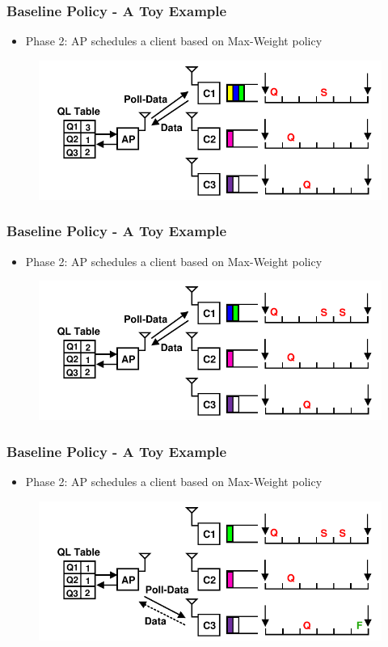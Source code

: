 \documentclass{beamer}
\begin{document}
\begin{frame}
\frametitle{Baseline Policy - A Toy Example}
\begin{itemize}
\item Phase 2: AP schedules a client based on Max-Weight policy
\end{itemize}
\begin{figure}
\centering
\includegraphics[scale=0.85]{animation_04.pdf}
\end{figure}
\end{frame}

\begin{frame}
\frametitle{Baseline Policy - A Toy Example}
\begin{itemize}
\item Phase 2: AP schedules a client based on Max-Weight policy
\end{itemize}
\begin{figure}
\centering
\includegraphics[scale=0.85]{animation_05.pdf}
\end{figure}
\end{frame}

\begin{frame}
\frametitle{Baseline Policy - A Toy Example}
\begin{itemize}
\item Phase 2: AP schedules a client based on Max-Weight policy
\end{itemize}
\begin{figure}
\centering
\includegraphics[scale=0.85]{animation_06.pdf}
\end{figure}
\end{frame}
\end{document}
